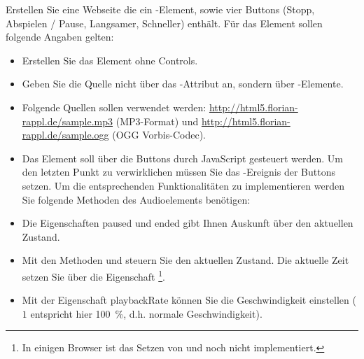 %
\par Erstellen Sie eine Webseite die ein -Element, sowie vier Buttons (Stopp, Abspielen / Pause, Langsamer, Schneller) enthält. Für das Element sollen folgende Angaben gelten:
%
\begin{itemize}
\item Erstellen Sie das Element ohne Controls.
\item Geben Sie die Quelle nicht über das -Attribut an, sondern über -Elemente.
\item Folgende Quellen sollen verwendet werden: \url{http://html5.florian-rappl.de/sample.mp3} (MP3-Format) und \url{http://html5.florian-rappl.de/sample.ogg} (OGG Vorbis-Codec).
\item Das Element soll über die Buttons durch JavaScript gesteuert werden.
Um den letzten Punkt zu verwirklichen müssen Sie das -Ereignis der Buttons setzen. Um die entsprechenden Funktionalitäten zu implementieren werden Sie folgende Methoden des Audioelements benötigen:
\item Die Eigenschaften paused und ended gibt Ihnen Auskunft über den aktuellen Zustand.
\item Mit den Methoden  und  steuern Sie den aktuellen Zustand. Die aktuelle Zeit setzen Sie über die Eigenschaft \footnote{In einigen Browser ist das Setzen von  und  noch nicht implementiert.}.
\item Mit der Eigenschaft playbackRate können Sie die Geschwindigkeit einstellen ($1$ entspricht hier \qty{100}{\%}, d.h. normale Geschwindigkeit).
\end{itemize}